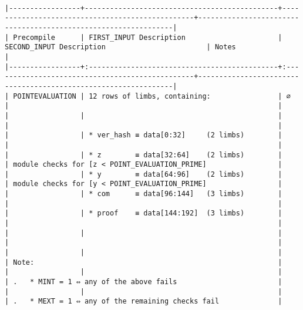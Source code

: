 \documentclass[varwidth=\maxdimen,margin=0.5cm,multi={verbatim}]{standalone}
\begin{document}
\begin{verbatim}

|-----------------+----------------------------------------------+-------------------------------------------------+----------------------------------------------------------------|
| Precompile      | FIRST_INPUT Description                      | SECOND_INPUT Description                        | Notes                                                          |
|-----------------+:---------------------------------------------+:------------------------------------------------+----------------------------------------------------------------|
| POINTEVALUATION | 12 rows of limbs, containing:                | ∅                                               |                                                                |
|                 |                                              |                                                 |                                                                |
|                 | * ver_hash ≡ data[0:32]     (2 limbs)        |                                                 |                                                                |
|                 | * z        ≡ data[32:64]    (2 limbs)        |                                                 | module checks for [z < POINT_EVALUATION_PRIME]                 |
|                 | * y        ≡ data[64:96]    (2 limbs)        |                                                 | module checks for [y < POINT_EVALUATION_PRIME]                 |
|                 | * com      ≡ data[96:144]   (3 limbs)        |                                                 |                                                                |
|                 | * proof    ≡ data[144:192]  (3 limbs)        |                                                 |                                                                |
|                 |                                              |                                                 |                                                                |
|                 |                                              |                                                 | Note:                                                          |
|                 |                                              |                                                 | .   * MINT = 1 ⇔ any of the above fails                        |
|                 |                                              |                                                 | .   * MEXT = 1 ⇔ any of the remaining checks fail              |

\end{verbatim}
\end{document}
